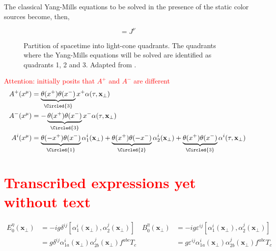 The classical Yang-Mills equations to be solved in the presence of the static color sources become, then,

\begin{equation}
	[D_\mu, F^{\mu \nu}] = J^\nu
\end{equation}


\begin{figure}\centering
	\caption{Partition of spacetime into light-cone quadrants. The quadrants where the Yang-Mills equations will be solved are identified as quadrants 1, 2 and 3. Adapted from \cite{Kovner_1995}.}
\label{fig:space_partition}\end{figure}

\begin{figure}\centering
	\caption{}
\end{figure}


\textcolor{red}{Attention: \cite{Kovner_1995} initially posits that $A^+$ and $A^-$ are different}
\begin{equation}
	\begin{split}
		A^+ (x^\mu) &= \underbrace{\theta (x^+) \theta(x^-)}_{\Circled{3}} x^+ \alpha (\tau, \mathbf{x}_\perp)\\
		A^- (x^\mu) &= - \underbrace{\theta (x^+) \theta(x^-)}_{\Circled{3}} x^- \alpha (\tau, \mathbf{x}_\perp) \\
		A^{i}(x^\mu) &= \underbrace{\theta (-x^+) \theta(x^-)}_{\Circled{1}} \alpha^i_1 (\mathbf{x}_\perp)
		+ \underbrace{\theta (x^+) \theta(-x^-)}_{\Circled{2}} \alpha^i_2 (\mathbf{x}_\perp)
		+ \underbrace{\theta (x^+) \theta(x^-)}_{\Circled{3}} \alpha^i (\tau, \mathbf{x}_\perp)
	\end{split}
\end{equation}

\section{\textcolor{red}{Transcribed expressions yet without text}}

\begin{subequations} \label{eq:initial_fields}
	\begin{equation}
		\begin{split}
			E^\eta_0(\mathbf{x}_\perp) & = -ig \delta^{ij} [\alpha^i_1 (\mathbf{x}_\perp), \alpha^j_2(\mathbf{x}_\perp)] \\
			& = g \delta^{ij}   \alpha^i_{1a} (\mathbf{x}_\perp) \alpha^j_{2b}(\mathbf{x}_\perp)f^{abc} T_c
		\end{split} \label{eq:initial_E}
	\end{equation}
	\begin{equation}
		\begin{split}
			B^\eta_0(\mathbf{x}_\perp) & = -ig \varepsilon^{ij} [\alpha^i_1 (\mathbf{x}_\perp), \alpha^j_2(\mathbf{x}_\perp)] \\
			& = g \varepsilon^{ij} \alpha^i_{1a} (\mathbf{x}_\perp) \alpha^j_{2b}(\mathbf{x}_\perp) f^{abc} T_c
		\end{split} \label{eq:initial_B}
	\end{equation}
\end{subequations}

